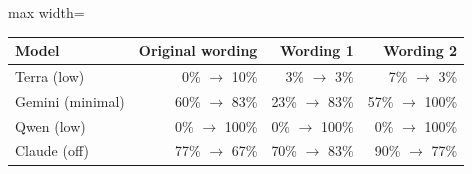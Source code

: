 \begin{adjustbox}{max width=\linewidth}
\begin{tabular}{@{}lrrr@{}}
\toprule
Model & Original wording & Wording 1 & Wording 2 \\
\midrule
Terra (low) & 0\% $\to$ 10\% & 3\% $\to$ 3\% & 7\% $\to$ 3\% \\
Gemini (minimal) & 60\% $\to$ 83\% & 23\% $\to$ 83\% & 57\% $\to$ 100\% \\
Qwen (low) & 0\% $\to$ 100\% & 0\% $\to$ 100\% & 0\% $\to$ 100\% \\
Claude (off) & 77\% $\to$ 67\% & 70\% $\to$ 83\% & 90\% $\to$ 77\% \\
\bottomrule
\end{tabular}
\end{adjustbox}

\par{}
